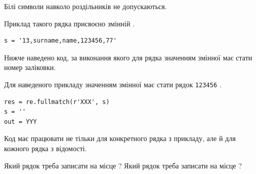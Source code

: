 \documentclass[12pt, ukrainian]{article}
\def\code#1{\Verb!#1!}
\begin{document}
{Білі символи навколо роздільників не допускаються.

Приклад такого рядка присвоєно змінній .



\begin{verbatim}
s = '13,surname,name,123456,77'
\end{verbatim}


Нижче наведено код, за виконання якого для рядка  значенням змінної  має стати номер заліковки.

Для наведеного прикладу значенням змінної  має стати рядок \code{123456} .



\begin{verbatim}
res = re.fullmatch(r'XXX', s)
s = ''
out = YYY
\end{verbatim}


Код має працювати не тільки для конкретного рядка з прикладу, але й для кожного рядка з відомості.


Який рядок треба записати на місце  ?
Який рядок треба записати на місце  ?\par

}
\end{document}
